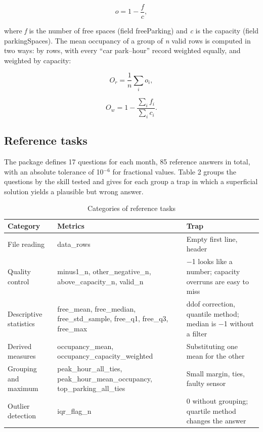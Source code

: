 \documentclass[default]{subfiles}
\begin{document}
{\begin{equation}
  o = 1 - \frac{f}{c},
  \label{eq:o}
\end{equation}

where \emph{f} is the number of free spaces (field freeParking) and \emph{c} is the capacity (field parkingSpaces). The mean occupancy of a group of \emph{n} valid rows is computed in two ways: by rows, with every ``car park--hour'' record weighted equally, and weighted by capacity:

\begin{equation}
  O_r = \frac{1}{n}\sum_i o_i,
  \label{eq:r}
\end{equation}

\begin{equation}
  O_w = 1 - \frac{\sum_i f_i}{\sum_i c_i}.
  \label{eq:w}
\end{equation}

\subsection{Reference tasks}

The package defines 17 questions for each month, 85 reference answers in total, with an absolute tolerance of 10$^{-6}$ for fractional values. Table 2 groups the questions by the skill tested and gives for each group a trap in which a superficial solution yields a plausible but wrong answer.

\begin{table}[htbp]
  \caption{Categories of reference tasks}
  \label{tab:2}
  \centering\small
  \begin{tabular}{p{}p{}p{}}
    \hline
    \textbf{Category} & \textbf{Metrics} & \textbf{Trap} \\ \hline
    File reading & data\_rows & Empty first line, header \\
    Quality control & minus1\_n, other\_negative\_n, above\_capacity\_n, valid\_n & $-$1 looks like a number; capacity overruns are easy to miss \\
    Descriptive statistics & free\_mean, free\_median, free\_std\_sample, free\_q1, free\_q3, free\_max & ddof correction, quantile method; median is $-$1 without a filter \\
    Derived measures & occupancy\_mean, occupancy\_capacity\_weighted & Substituting one mean for the other \\
    Grouping and maximum & peak\_hour\_all\_ties, peak\_hour\_mean\_occupancy, top\_parking\_all\_ties & Small margin, ties, faulty sensor \\
    Outlier detection & iqr\_flag\_n & 0 without grouping; quartile method changes the answer \\
    \hline
  \end{tabular}
\end{table}

}
\end{document}

